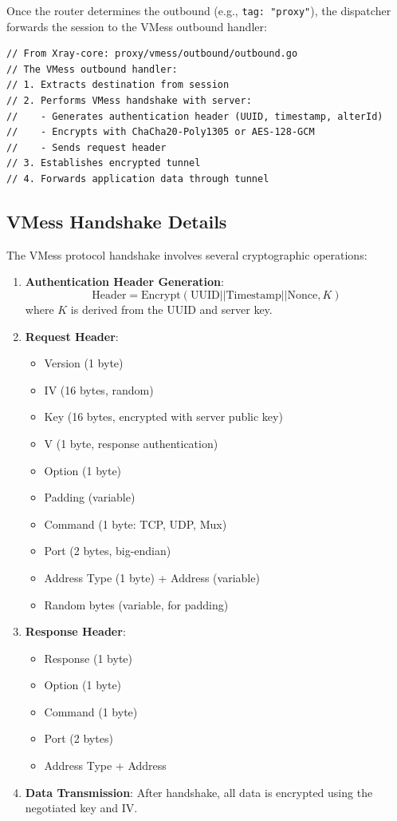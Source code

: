 Once the router determines the outbound (e.g., \texttt{tag: "proxy"}), the dispatcher forwards the session to the VMess outbound handler:

\begin{verbatim}
// From Xray-core: proxy/vmess/outbound/outbound.go
// The VMess outbound handler:
// 1. Extracts destination from session
// 2. Performs VMess handshake with server:
//    - Generates authentication header (UUID, timestamp, alterId)
//    - Encrypts with ChaCha20-Poly1305 or AES-128-GCM
//    - Sends request header
// 3. Establishes encrypted tunnel
// 4. Forwards application data through tunnel
\end{verbatim}

\subsection{VMess Handshake Details}

The VMess protocol handshake involves several cryptographic operations:

\begin{enumerate}
    \item \textbf{Authentication Header Generation}:
    \[
    \text{Header} = \text{Encrypt}(\text{UUID} || \text{Timestamp} || \text{Nonce}, K)
    \]
    where $K$ is derived from the UUID and server key.
    
    \item \textbf{Request Header}:
    \begin{itemize}
        \item Version (1 byte)
        \item IV (16 bytes, random)
        \item Key (16 bytes, encrypted with server public key)
        \item V (1 byte, response authentication)
        \item Option (1 byte)
        \item Padding (variable)
        \item Command (1 byte: TCP, UDP, Mux)
        \item Port (2 bytes, big-endian)
        \item Address Type (1 byte) + Address (variable)
        \item Random bytes (variable, for padding)
    \end{itemize}
    
    \item \textbf{Response Header}:
    \begin{itemize}
        \item Response (1 byte)
        \item Option (1 byte)
        \item Command (1 byte)
        \item Port (2 bytes)
        \item Address Type + Address
    \end{itemize}
    
    \item \textbf{Data Transmission}:
    After handshake, all data is encrypted using the negotiated key and IV.
\end{enumerate}

